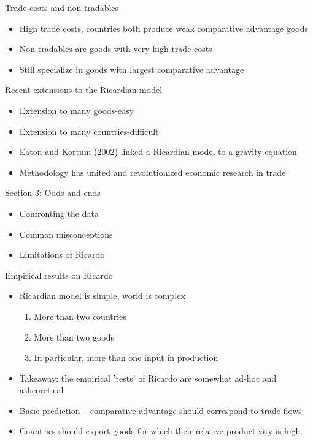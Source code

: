 \documentclass[ignorenonframetext,]{beamer}
\begin{document}
\begin{frame}{Trade costs and non-tradables}

    \begin{itemize}
        \item High trade costs, countries both produce weak comparative advantage goods
        \item Non-tradables are goods with very high trade costs 
        \item Still specialize in goods with largest comparative advantage
    \end{itemize}

\end{frame}

\begin{frame}{Recent extensions to the Ricardian model}

    \begin{itemize}
        \item Extension to many goods-easy
        \item Extension to many countries-difficult
        \item Eaton and Kortum (2002) linked a Ricardian model to a gravity equation 
        \item Methodology has united and revolutionized economic research in trade
    \end{itemize}

\end{frame}

\begin{frame}
    Section 3: Odds and ends 
    \begin{itemize}
        \item Confronting the data
        \item Common misconceptions
        \item Limitations of Ricardo
    \end{itemize}
\end{frame}

\begin{frame}{Empirical results on Ricardo}

    \begin{itemize}
        \item Ricardian model is simple, world is complex
        \begin{enumerate}
            \item More than two countries
            \item More than two goods 
            \item In particular, more than one input in production
        \end{enumerate}
        \item Takeaway: the empirical 'tests' of Ricardo are somewhat ad-hoc and atheoretical
        \item Basic prediction -- comparative advantage should correspond to trade flows 
        \item Countries should export goods for which their relative productivity is high 
    \end{itemize}

\end{frame}
\end{document}
